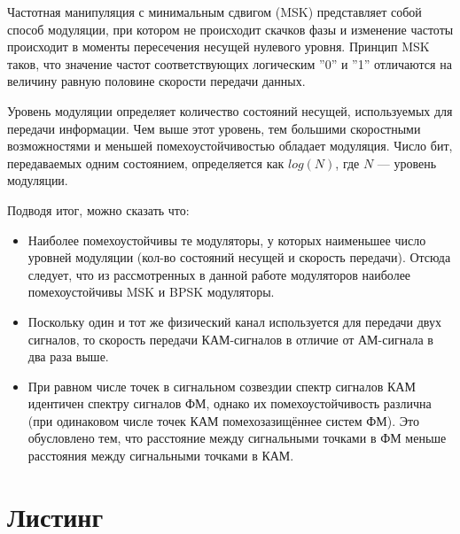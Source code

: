 Частотная манипуляция с минимальным сдвигом (MSK) представляет собой способ модуляции, при котором не происходит скачков
 фазы и изменение частоты происходит в моменты пересечения несущей нулевого уровня.
  Принцип MSK таков, что значение частот соответствующих логическим ''0'' и ''1'' отличаются на величину равную половине скорости передачи данных.

Уровень модуляции определяет количество состояний несущей, используемых для передачи информации. Чем выше этот уровень, тем большими скоростными возможностями и меньшей помехоустойчивостью обладает модуляция. Число бит, передаваемых одним состоянием, определяется как $log (N)$, где $N$ — уровень модуляции.

Подводя итог, можно сказать что:
\begin{itemize}

\item Наиболее помехоустойчивы те модуляторы, у которых наименьшее число уровней модуляции
 (кол-во состояний несущей и скорость передачи). Отсюда следует, что из рассмотренных в данной работе модуляторов 
 наиболее помехоустойчивы MSK и BPSK модуляторы.
 
\item Поскольку один и тот же физический канал используется для передачи двух сигналов, то скорость передачи
 КАМ-сигналов в отличие от АМ-сигнала в два раза выше.

\item При равном числе точек в сигнальном созвездии спектр сигналов КАМ идентичен спектру сигналов ФМ, однако их помехоустойчивость различна (при одинаковом числе точек КАМ помехозазищённее систем ФМ).
 Это обусловлено тем, что расстояние между сигнальными точками в ФМ меньше расстояния между сигнальными точками в КАМ.

\end{itemize}
\newpage

\section{Листинг}



